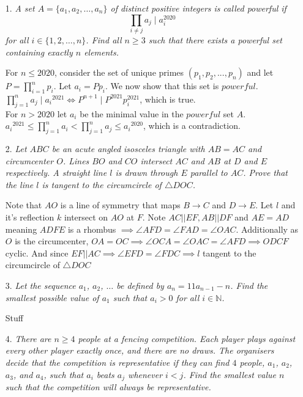 \documentclass{article}
\begin{document}
\begin{enumerate}

\medskip
\item[1.] %
{\itshape A set $A = \{a_1, a_2, \dotsc, a_n\}$ of distinct positive integers is called \emph{powerful} if
\[ \prod_{i \neq j} a_j \mid a_i^{2020} \]
for all $i \in \{1, 2, \dotsc, n\}$.
Find all $n \ge 3$ such that there exists a powerful set containing exactly $n$ elements.}

For $n\leq2020$, consider the set of unique primes $(p_1,p_2,...,p_n)$ and let $P = \prod_{i=1}^{n} p_i$. Let $a_i = Pp_i$. We now show that this set is $powerful$.
\\$\prod_{j=1}^{n} a_j \mid {a_i}^{2021} \iff P^{n+1} \mid P^{2021}p_i^{2021}$, which is true.
\\For $n>2020$ let $a_i$ be the minimal value in the $powerful$ set $A$.
\\${a_i}^{2021} \leq \prod_{j=1}^{n} a_i <  \prod_{j=1}^{n} a_j \leq {a_i}^{2020}$, which is a contradiction.


\medskip
\item[2.] %
{\itshape Let $ABC$ be an acute angled isosceles triangle with $AB = AC$ and circumcenter $O$.
Lines $BO$ and $CO$ intersect $AC$ and $AB$ at $D$ and $E$ respectively.
A straight line $l$ is drawn through $E$ parallel to $AC$.
Prove that the line $l$ is tangent to the circumcircle of $\triangle DOC$.}

Note that $AO$ is a line of symmetry that maps $B\rightarrow C$ and $D\rightarrow E$. Let $l$ and it's reflection $k$ intersect on $AO$ at $F$.
Note $AC||EF, AB||DF$ and $AE=AD$ meaning $ADFE$ is a rhombus $\implies \angle AFD = \angle FAD = \angle OAC$.
Additionally as $O$ is the circumcenter, $OA = OC \implies \angle OCA = \angle OAC = \angle AFD \implies ODCF$ cyclic.
And since $EF||AC\implies\angle EFD = \angle FDC\implies l$ tangent to the circumcircle of $\triangle DOC$


\medskip
\item[3.] %
{\itshape Let the sequence $a_1$, $a_2$, $\dotsc$ be defined by $a_n = 11 a_{n - 1} - n$.
Find the smallest possible value of $a_1$ such that $a_i > 0$ for all $i \in \mathbb{N}$.}

Stuff

\medskip
\item[4.] %
{\itshape There are $n \ge 4$ people at a fencing competition.
Each player plays against every other player exactly once, and there are no draws.
The organisers decide that the competition is representative if they can find $4$ people, $a_1$, $a_2$, $a_3$, and $a_4$, such that $a_i$ beats $a_j$ whenever $i < j$.
Find the smallest value $n$ such that the competition will always be representative.}


\end{enumerate}
\end{document}
